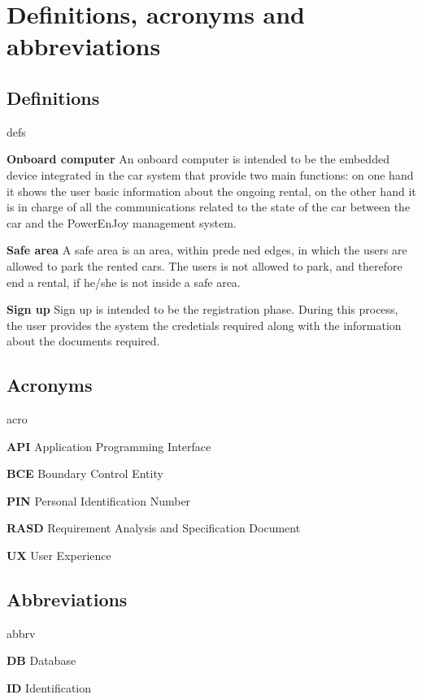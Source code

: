 \section{Definitions, acronyms and abbreviations}

\subsection{Definitions}
	\begin{labeling}{defs}
		\item[\textbf{Onboard computer}] An onboard computer is intended to be the embedded device integrated in the car system that provide two main functions: on one hand it shows the user basic information about the ongoing rental, on the other hand it is in charge of all the communications related to the state of the car between the car and the PowerEnJoy management system.
		\item[\textbf{Safe area}] A safe area is an area, within predened edges, in which the users are allowed to park the rented cars. The users is not allowed to park, and therefore end a rental, if he/she is not inside a safe area.
		\item[\textbf{Sign up}] Sign up is intended to be the registration phase. During this process, the user provides the system the credetials required along with the information about the documents required.
	\end{labeling}

\subsection{Acronyms}
	\begin{labeling}{acro}
		\item[\textbf{API}] Application Programming Interface
		\item[\textbf{BCE}] Boundary Control Entity
		\item[\textbf{PIN}] Personal Identification Number
		\item[\textbf{RASD}] Requirement Analysis and Specification Document
		\item[\textbf{UX}] User Experience
	\end{labeling}

\subsection{Abbreviations}
	\begin{labeling}{abbrv}
		\item[\textbf{DB}] Database
		\item[\textbf{ID}] Identification
	\end{labeling}